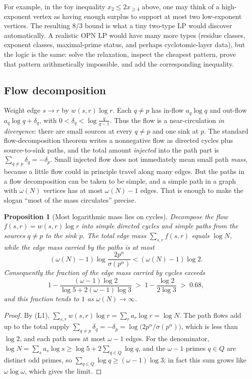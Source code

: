 \documentclass[11pt]{article}
\newtheorem{proposition}[theorem]{Proposition}
\theoremstyle{definition}
\theoremstyle{remark}
\begin{document}
For example, in the toy inequality $x_2\le2x_{\ge4}$ above, one may think of
a high-exponent vertex as having enough surplus to support at most two
low-exponent vertices.  The resulting $8/3$ bound is what a tiny two-type LP
would discover automatically.  A realistic OPN LP would have many more types
(residue classes, exponent classes, maximal-prime status, and perhaps
cyclotomic-layer data), but the logic is the same: solve the relaxation,
inspect the cheapest pattern, prove that pattern arithmetically impossible,
and add the corresponding inequality.

\subsection{Flow decomposition}

Weight edge $s\to r$ by $w(s,r)\log r$.  Each $q\ne p$ has in-flow
$a_q\log q$ and out-flow $a_q\log q+\delta_q$, with
$0<\delta_q<\log\frac q{q-1}$.  Thus the flow is a near-circulation
\emph{in divergence}: there are small sources at every $q\ne p$ and one
sink at $p$.  The standard flow-decomposition theorem writes a nonnegative
flow as directed cycles plus source-to-sink paths, and the total amount
\emph{injected} into the path part is $\sum_{q\ne p}\delta_q=-\delta_p$.
Small injected flow does not immediately mean small path \emph{mass}, because
a little flow could in principle travel along many edges.  But the paths in a
flow decomposition can be taken to be simple, and a simple path in a graph
with $\omega(N)$ vertices has at most $\omega(N)-1$ edges.  That is enough to
make the slogan ``most of the mass circulates'' precise.

\begin{proposition}[Most logarithmic mass lies on cycles]\label{prop:pathmass}
Decompose the flow $f(s,r)=w(s,r)\log r$ into simple directed cycles and
simple paths from the sources $q\ne p$ to the sink $p$.  The total edge mass
$\sum_{s,r}f(s,r)$ equals $\log N$, while the edge mass carried by the paths
is at most
\[
(\omega(N)-1)\log\frac{2p^\alpha}{\sigma(p^\alpha)}<(\omega(N)-1)\log2 .
\]
Consequently the fraction of the edge mass carried by cycles exceeds
\[
1-\frac{(\omega-1)\log2}{\log5+2(\omega-1)\log3}
\;>\;1-\frac{\log2}{2\log3}\;>\;0.68,
\]
and this fraction tends to $1$ as $\omega(N)\to\infty$.
\end{proposition}

\begin{proof}
By (L1), $\sum_{s,r}w(s,r)\log r=\sum_r a_r\log r=\log N$.  The path flows
add up to the total supply
$\sum_{q\ne p}\delta_q=-\delta_p=\log\bigl(2p^\alpha/\sigma(p^\alpha)\bigr)$,
which is less than $\log2$, and each path uses at most $\omega-1$ edges.  For
the denominator, $\log N=\sum_s a_s\log s\ge\log5+2\sum_{q\in Q}\log q$, and
the $\omega-1$ primes $q\in Q$ are distinct odd primes, so
$\sum_{q\in Q}\log q\ge(\omega-1)\log3$; in fact this sum grows like
$\omega\log\omega$, which gives the limit.
\end{proof}
\end{document}
